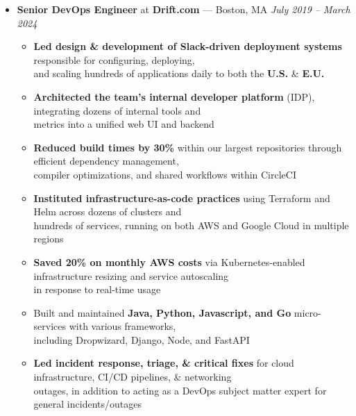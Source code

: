 \documentclass{article}
\begin{document}
\begin{itemize}[label={},leftmargin=*]
  \item \textbf{Senior DevOps Engineer} at \textbf{Drift.com} --- Boston, MA \hfill {\em July 2019 -- March 2024}
  \begin{itemize}[label={$\bullet$}]
    \item \textbf{Led design \& development of Slack-driven deployment systems} responsible for configuring, deploying,\\
          and scaling hundreds of applications daily to both the \textbf{U.S.} \& \textbf{E.U.}
    \item \textbf{Architected the team's internal developer platform} (IDP), integrating dozens of internal tools and\\
          metrics into a unified web UI and backend
    \item \textbf{Reduced build times by 30\%} within our largest repositories through efficient dependency management,\\
          compiler optimizations, and shared workflows within CircleCI
    \item \textbf{Instituted infrastructure-as-code practices} using Terraform and Helm across dozens of clusters and\\
          hundreds of services, running on both AWS and Google Cloud in multiple regions
    \item \textbf{Saved 20\% on monthly AWS costs} via Kubernetes-enabled infrastructure resizing and service autoscaling\\
          in response to real-time usage
    \item Built and maintained \textbf{Java, Python, Javascript, and Go} micro-services with various frameworks,\\ 
          including Dropwizard, Django, Node, and FastAPI
    \item \textbf{Led incident response, triage, \& critical fixes} for cloud infrastructure, CI/CD pipelines, \& networking\\
          outages, in addition to acting as a DevOps subject matter expert for general incidents/outages

  \end{itemize}


\end{itemize}
\end{document}
